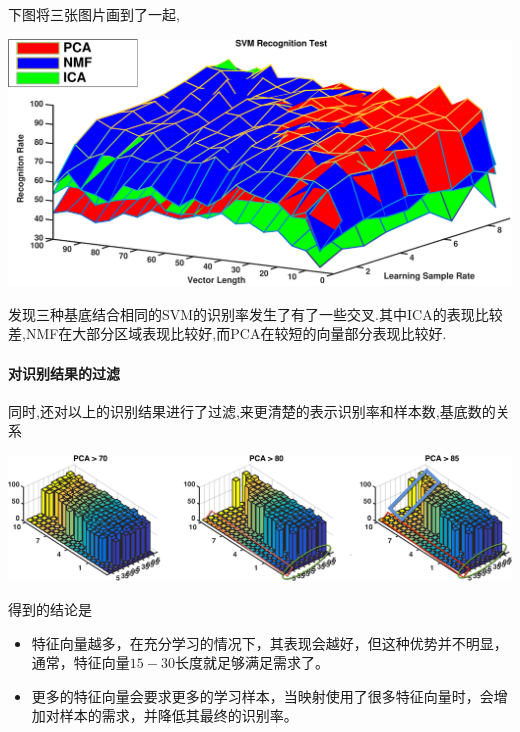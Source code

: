 	
	下图将三张图片画到了一起,	
	\begin{center}
	\begin{minipage}[t]{\linewidth}
	\center
	{
	\includegraphics[width=\textwidth]{Img/svm_pcanmfica} 
	
	}
	\end{minipage}
	\medskip
	\end{center}
	发现三种基底结合相同的SVM的识别率发生了有了一些交叉.其中ICA的表现比较差,NMF在大部分区域表现比较好,而PCA在较短的向量部分表现比较好.
	
	\paragraph{对识别结果的过滤} 同时,还对以上的识别结果进行了过滤,来更清楚的表示识别率和样本数,基底数的关系
	
		\begin{center}
	\begin{minipage}[t]{\linewidth}
	\center
	{
	\includegraphics[width=\textwidth]{Img/svm_pcafilter} 
		\captionsetup{justification=centering}
	}
	\end{minipage}
	\medskip
	\end{center}
	
	得到的结论是
	\begin{itemize}
	\item 特征向量越多，在充分学习的情况下，其表现会越好，但这种优势并不明显，通常，特征向量$15-30$长度就足够满足需求了。
	\item 更多的特征向量会要求更多的学习样本，当映射使用了很多特征向量时，会增加对样本的需求，并降低其最终的识别率。
	\end{itemize}	
	
